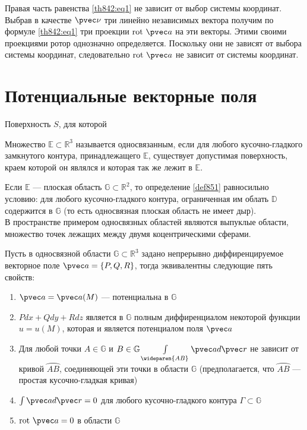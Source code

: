 Правая часть равенства \eqref{th842:eq1} не зависит от выбор системы координат.
Выбрав в качестве $\pvec \nu$ три линейно независимых вектора получим по
формуле \eqref{th842:eq1} три проекции $\mbox{rot} \ \pvec a$ на эти векторы.
Этими своими проекциями ротор однозначно определяется. Поскольку они не зависят
от выбора системы координат, следовательно $\mbox{rot} \ \pvec a$ не зависит от
системы координат.

\section{Потенциальные векторные поля}
Поверхность $S$, для которой
\begin{definition}
  \label{def851}
  Множество $\mathbb{E} \subset \mathbb{R}^3$ называется односвязанным, если
  для любого кусочно-гладкого замкнутого контура, принадлежащего $\mathbb{E}$,
  существует допустимая поверхность, краем которой он являлся и которая так же
  лежит в $\mathbb{E}$. \\
\end{definition}
Если $\mathbb{E}$ --- плоская область $\mathbb{G} \subset \mathbb{R}^2$, то
определение \eqref{def851} равносильно условию: для любого кусочно-гладкого
контура, ограниченная им облать $\mathbb{D}$ содержится в $\mathbb{G}$ (то есть
односвязная плоская область не имеет дыр). \\

В пространстве примером односвязных областей являются выпуклые области,
множество точек лежащих между двумя коцентрическими сферами.

\begin{theorem}
  Пусть в односвязной области $\mathbb{G} \subset \mathbb{R}^3$ задано
  непрерывно диффиренцируемое векторное поле $\pvec a = \{P, Q, R\}$, тогда
  эквивалентны следующие пять свойств:
  \begin{enumerate}
    \item $\pvec a = \pvec a(M)$ --- потенциальна в $\mathbb{G}$
    \item $Pdx + Qdy + Rdz$ является в $\mathbb{G}$ полным диффиренциалом
      некоторой функции $u = u(M)$, которая и является потенциалом поля $\pvec
      a$
    \item Для любой точки $A \in \mathbb{G}$ и $B \in \mathbb{G}
      \int\limits_{\wideparen{AB}} \pvec a d \pvec r$ не зависит от кривой
      $\wideparen{AB}$, соединяющей эти точки в области $\mathbb{G}$
      (предполагается, что $\wideparen{AB}$ --- простая кусочно-гладкая
      кривая)
    \item $\int \pvec a d \pvec r = 0$ для любого кусочно-гладкого контура
      $\Gamma \subset \mathbb{G}$
    \item $\mbox{rot} \ \pvec a = 0$ в области $\mathbb{G}$
  \end{enumerate}
\end{theorem}

